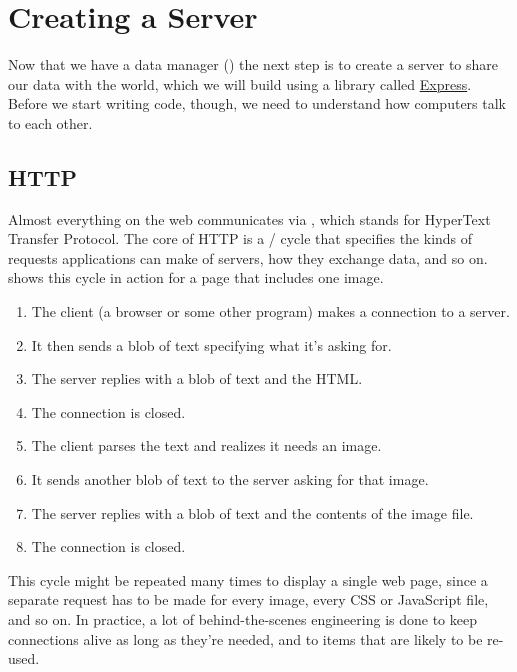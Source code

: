 \chapter{Creating a Server}\label{s:server}

Now that we have a data manager ()
the next step is to create a server to share our data with the world,
which we will build using a library called \href{https://expressjs.org/}{Express}.
Before we start writing code,
though,
we need to understand how computers talk to each other.

\section{HTTP}\label{s:server-http}

Almost everything on the web communicates via ,
which stands for HyperText Transfer Protocol.
The core of HTTP is a / cycle
that specifies the kinds of requests applications can make of servers,
how they exchange data,
and so on.
 shows this cycle in action for a page that includes one image.


\begin{enumerate}
\item
  The client (a browser or some other program) makes a connection to a server.
\item
  It then sends a blob of text specifying what it's asking for.
\item
  The server replies with a blob of text and the HTML.
\item
  The connection is closed.
\item
  The client parses the text and realizes it needs an image.
\item
  It sends another blob of text to the server asking for that image.
\item
  The server replies with a blob of text and the contents of the image file.
\item
  The connection is closed.
\end{enumerate}

This cycle might be repeated many times to display a single web page,
since a separate request has to be made for every image,
every CSS or JavaScript file,
and so on.
In practice,
a lot of behind-the-scenes engineering is done to keep connections alive as long as they're needed,
and to  items that are likely to be re-used.


